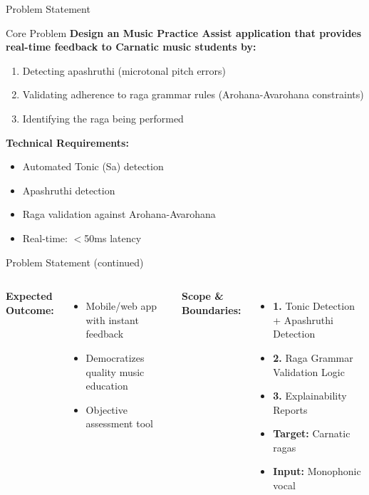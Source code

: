 \documentclass[aspectratio=169,11pt]{beamer}
\begin{document}
	\begin{frame}{Problem Statement}
		\begin{alertblock}{Core Problem}
			\textbf{Design an Music Practice Assist application that provides real-time feedback to Carnatic music students by:}
			\begin{enumerate}
				\item Detecting apashruthi (microtonal pitch errors)
				\item Validating adherence to raga grammar rules (Arohana-Avarohana constraints)
				\item Identifying the raga being performed
			\end{enumerate}
		\end{alertblock}
		
		\vspace{0.3cm}
		
		\textbf{Technical Requirements:}
		\begin{itemize}
			\item Automated Tonic (Sa) detection
			\item Apashruthi detection
			\item Raga validation against Arohana-Avarohana
			\item Real-time: $<$50ms latency
		\end{itemize}
	\end{frame}
	
	\begin{frame}{Problem Statement (continued)}
		\begin{columns}
			\textbf{Expected Outcome:}
			\begin{itemize}
				\item Mobile/web app with instant feedback
				\item Democratizes quality music education
				\item Objective assessment tool
			\end{itemize}
			
			\textbf{Scope \& Boundaries:}
			\begin{itemize}
				\item \textbf{1.} Tonic Detection + Apashruthi Detection
				\item \textbf{2.} Raga Grammar Validation Logic
				\item \textbf{3.} Explainability Reports
				\item \textbf{Target:} Carnatic ragas
				\item \textbf{Input:} Monophonic vocal
			\end{itemize}
		\end{columns}
	\end{frame}
	
\end{document}
